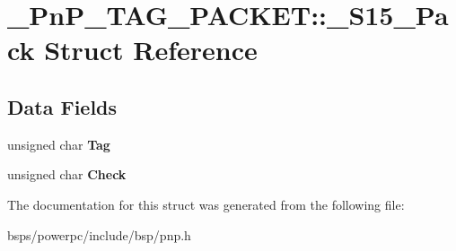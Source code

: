 \hypertarget{struct__PnP__TAG__PACKET_1_1__S15__Pack}{}\section{\+\_\+\+Pn\+P\+\_\+\+T\+A\+G\+\_\+\+P\+A\+C\+K\+ET\+::\+\_\+\+S15\+\_\+\+Pack Struct Reference}
\label{struct__PnP__TAG__PACKET_1_1__S15__Pack}
\subsection*{Data Fields}
\begin{DoxyCompactItemize}
\item 
\mbox{\label{struct__PnP__TAG__PACKET_1_1__S15__Pack_a04c01f48d766a9debc9f7a572cb61478}} 
unsigned char {\bfseries Tag}
\item 
\mbox{\label{struct__PnP__TAG__PACKET_1_1__S15__Pack_a30346b334b1f25e3608953a749bbbc07}} 
unsigned char {\bfseries Check}
\end{DoxyCompactItemize}


The documentation for this struct was generated from the following file\+:\begin{DoxyCompactItemize}
\item 
bsps/powerpc/include/bsp/pnp.\+h\end{DoxyCompactItemize}
